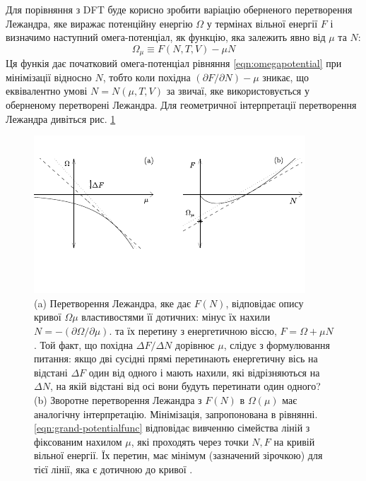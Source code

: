 Для порівняння з DFT буде корисно зробити варіацію оберненого перетворення Лежандра, яке виражає потенційну енергію $\Omega$ у термінах вільної енергії $F$ і визначимо наступний омега-потенціал, як функцію, яка залежить явно від $\mu$ та $N$:
\begin{equation}
	\label{eqn:grand-potentialfunc}
	\Omega_\mu \equiv F(N,T,V) - {\mu} N
\end{equation}
Ця функія дає початковий омега-потенціал рівняння \ref{eqn:omegapotential} при мінімізації відносно $N$, тобто коли похідна $(\partial{F}/\partial{N}) - \mu$ зникає, що еквівалентно умові $N = N(\mu,T,V)$ за звичаї, яке використовується у оберненому перетворені Лежандра. Для геометричної інтерпретації перетворення Лежандра дивіться рис. \ref{fig:legander_transform}
\begin{figure}[H]
  \centering
  \includegraphics[scale=2.5]{img/Legender_transform.pdf}
  \caption{(a) Перетворення Лежандра, яке дає $F(N)$, відповідає опису кривої $\Omega\mu$ властивостями її дотичних: мінус їх нахили $N = -(\partial{\Omega}/\partial{\mu})$. та їх перетину з енергетичною віссю, $F = \Omega + \mu N$. Той факт, що похідна $\Delta F / \Delta N$ дорівнює $\mu$, слідує з формулювання питання: якщо дві сусідні прямі перетинають енергетичну вісь на відстані $\Delta F$ один від одного і мають нахили, які відрізняються на $\Delta N$, на якій відстані від осі вони будуть перетинати один одного? (b) Зворотне перетворення Лежандра з $F(N)$ в $\Omega (\mu)$ має аналогічну інтерпретацію. Мінімізація, запропонована в рівнянні. \ref{eqn:grand-potentialfunc} відповідає вивченню сімейства ліній з фіксованим нахилом $\mu$, які проходять через точки $N, F$ на кривій вільної енергії. Їх перетин, має мінімум (зазначений зірочкою) для тієї лінії, яка є дотичною до кривої \cite{Argaman_2000}.}
  \label{fig:legander_transform}
\end{figure}
